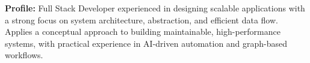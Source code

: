 \vspace{8pt}
\noindent
{\normalsize \textbf{Profile:} Full Stack Developer experienced in designing scalable applications with a strong focus on system architecture, abstraction, and efficient data flow. Applies a conceptual approach to building maintainable, high-performance systems, with practical experience in AI-driven automation and graph-based workflows.\par}

\vspace{2pt}
